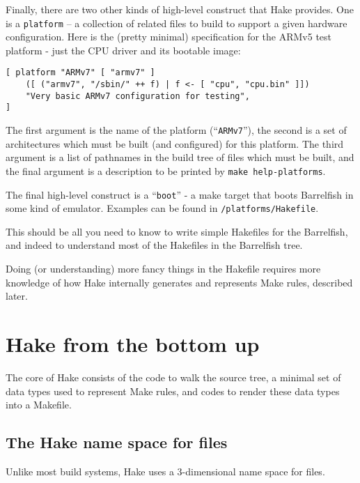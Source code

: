 \documentclass[a4paper,twoside]{report} %
\begin{document}
Finally, there are two other kinds of high-level construct that Hake
provides.  One is a \texttt{platform} -- a collection of related files
to build to support a given hardware configuration.  Here is the
(pretty minimal) specification for the ARMv5 test platform - just the
CPU driver and its bootable image:
\begin{verbatim}
[ platform "ARMv7" [ "armv7" ]
    ([ ("armv7", "/sbin/" ++ f) | f <- [ "cpu", "cpu.bin" ]])
    "Very basic ARMv7 configuration for testing",
]
\end{verbatim}
The first argument is the name of the platform (``\texttt{ARMv7}''),
the second is a set of architectures which must be built (and
configured) for this platform.  The third argument is a list of
pathnames in the build tree of files which must be built, and the
final argument is a description to be printed by \texttt{make
  help-platforms}.

The final high-level construct is a ``\texttt{boot}'' - a make target
that boots Barrelfish in some kind of emulator.  Examples can be found
in \texttt{/platforms/Hakefile}.

This should be all you need to know to write simple Hakefile{s} for
the Barrelfish, and indeed to understand most of the Hakefile{s} in
the Barrelfish tree.

Doing (or understanding) more fancy things in the Hakefile requires
more knowledge of how Hake internally generates and represents Make
rules, described later.

\chapter{Hake from the bottom up}

The core of Hake consists of the code to walk the source tree, a
minimal set of data types used to represent Make rules, and codes to
render these data types into a Makefile.

\section{The Hake name space for files}

Unlike most build systems, Hake uses a 3-dimensional name space for
files.
\end{document}
